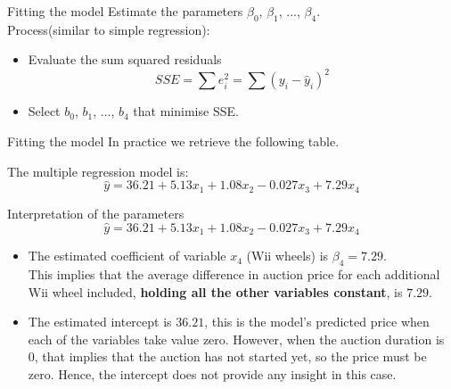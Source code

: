 \documentclass[12pt,a4paper]{beamer}
\begin{document}
		\begin{frame}{Fitting the model}
		Estimate the parameters $\beta_0$, $\beta_1$, ..., $\beta_4$.\\
		Process(similar to simple regression):
			\begin{itemize}
				\item Evaluate the sum squared residuals
				\[SSE=\sum e^2_i=\sum (y_i-\hat{y}_i)^2\]
				\item Select $b_0$, $b_1$, ..., $b_4$ that minimise SSE. 
			\end{itemize}
		\end{frame}
		\begin{frame}{Fitting the model}
			In practice we retrieve the following table.
			\begin{table}[ht]
			
			
			\end{table}
			The multiple regression model is:
			\[\hat{y} = 36.21 + 5.13x_1 + 1.08x_2 - 0.027x_3 + 7.29x_4\]
		\end{frame}
		\begin{frame}{Interpretation of the parameters}
			\[\hat{y} = 36.21 + 5.13x_1 + 1.08x_2 - 0.027x_3 + 7.29x_4\]
			\small
			\begin{itemize}
				\item  The estimated coefficient of variable $x_4$ (Wii wheels) is $\beta_4= 7.29$. \\ This implies that the average difference in auction price for each additional Wii wheel included, \textbf{holding all the other variables constant}, is $7.29$.
				\item The estimated intercept is $36.21$, this is the model's predicted price when each of the variables take value zero. However, when the auction duration is 0, that implies that the auction has not started yet, so the price must be zero. Hence, the intercept does not provide any insight in this case.
				\end{itemize}
	\end{frame}
\end{document}
